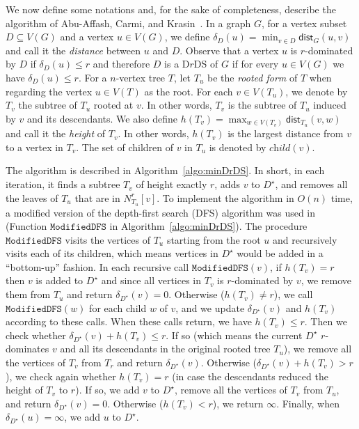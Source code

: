 \documentclass[a4paper]{article}
\theoremstyle{plain}
\theoremstyle{definition}
\newcommand{\dist}{\mathsf{dist}} %
\begin{document}
We now define some notations and, for the sake of completeness, describe the algorithm of Abu-Affash, Carmi, and Krasin~\cite{Abu-AffashCK22}.
In a graph $G$, for a vertex subset $D \subseteq V(G)$ and a vertex $u \in V(G)$, we define $\delta_D(u) = \min_{v \in D}\dist_G(u, v)$ and call it the \textit{distance} between $u$ and $D$.
Observe that a vertex $u$ is $r$-dominated by $D$ if $\delta_D(u) \leq r$ and therefore $D$ is a D$r$DS of $G$ if for every $u \in V(G)$ we have $\delta_D(u) \leq r$.
For a $n$-vertex tree $T$, let $T_u$ be the \textit{rooted form} of $T$ when regarding the vertex $u \in V(T)$ as the root.
For each $v \in V(T_u)$, we denote by $T_v$ the subtree of $T_u$ rooted at $v$.
In other words, $T_v$ is the subtree of $T_u$ induced by $v$ and its descendants.
We also define $h(T_v) = \max_{w \in V(T_v)}\dist_{T_u}(v, w)$ and call it the \textit{height} of $T_v$.
In other words, $h(T_v)$ is the largest distance from $v$ to a vertex in $T_v$.
The set of children of $v$ in $T_u$ is denoted by $\textit{child}(v)$.

The algorithm is described in Algorithm~\ref{algo:minDrDS}.
In short, in each iteration, it finds a subtree $T_v$ of height exactly $r$, adds $v$ to $D^\star$, and removes all the leaves of $T_u$ that are in $N^r_{T_u}[v]$.
To implement the algorithm in $O(n)$ time, a modified version of the depth-first search (DFS) algorithm was used in~\cite{Abu-AffashCK22}
(Function $\mathtt{ModifiedDFS}$ in Algorithm~\ref{algo:minDrDS}).
The procedure $\mathtt{ModifiedDFS}$ visits the vertices of $T_u$ starting from the root $u$ and recursively visits each of its children, which means vertices in $D^\star$ would be added in a ``bottom-up'' fashion.
In each recursive call $\mathtt{ModifiedDFS}(v)$, if $h(T_v) = r$ then $v$ is added to $D^\star$ and since all vertices in $T_v$ is $r$-dominated by $v$, we remove them from $T_u$ and return $\delta_{D^\star}(v) = 0$.
Otherwise ($h(T_v) \neq r$), we call $\mathtt{ModifiedDFS}(w)$ for each child $w$ of $v$, and we update $\delta_{D^\star}(v)$ and $h(T_v)$ according to these calls.
When these calls return, we have $h(T_v) \leq r$.
Then we check whether $\delta_{D^\star}(v) + h(T_v) \leq r$.
If so (which means the current $D^\star$ $r$-dominates $v$ and all its descendants in the original rooted tree $T_u$), we remove all the vertices of $T_v$ from $T_r$ and return $\delta_{D^\star}(v)$.
Otherwise ($\delta_{D^\star}(v) + h(T_v) > r$), we check again whether $h(T_v) = r$ (in case the descendants reduced the height of $T_v$ to $r$).
If so, we add $v$ to $D^\star$, remove all the vertices of $T_v$ from $T_u$, and return $\delta_{D^\star}(v) = 0$.
Otherwise ($h(T_v) < r$), we return $\infty$.
Finally, when $\delta_{D^\star}(u) = \infty$, we add $u$ to $D^\star$.
\end{document}
